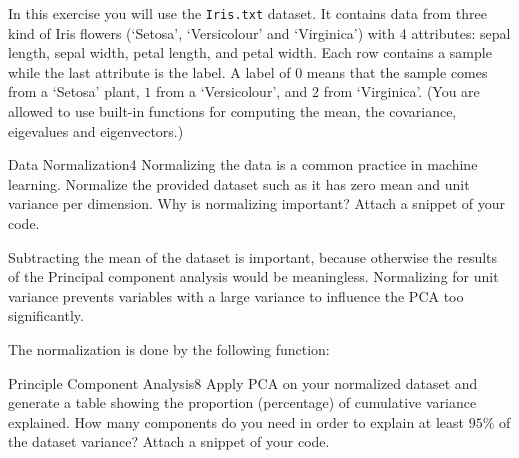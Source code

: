 \newif\ifvimbug
\vimbugfalse

\ifvimbug

\fi

In this exercise you will use the \texttt{Iris.txt} dataset. It contains data from three kind of Iris flowers (`Setosa', `Versicolour' and `Virginica') with 4 attributes: sepal length, sepal width, petal length, and petal width. Each row contains a sample while the last attribute is the label. A label of $0$ means that the sample comes from a `Setosa' plant, $1$ from a `Versicolour', and $2$ from `Virginica'.
(You are allowed to use built-in functions for computing the mean, the covariance, eigevalues and eigenvectors.)

\begin{questions}


\begin{question}{Data Normalization}{4}
Normalizing the data is a common practice in machine learning. Normalize the provided dataset such as it has zero mean and unit variance per dimension. Why is normalizing important?
Attach a snippet of your code. 

\begin{answer}
Subtracting the mean of the dataset is important, because otherwise the results of the Principal component analysis would be meaningless. Normalizing for unit variance prevents variables with a large variance to influence the PCA too significantly.

The normalization is done by the following function:

	
\end{answer}

\end{question}


\begin{question}{Principle Component Analysis}{8}
Apply PCA on your normalized dataset and generate a table showing the proportion (percentage) of cumulative variance explained. 
How many components do you need in order to explain at least $95\%$ of the dataset variance? 
Attach a snippet of your code.

\begin{answer}\end{answer}


\end{question}
\end{questions}
